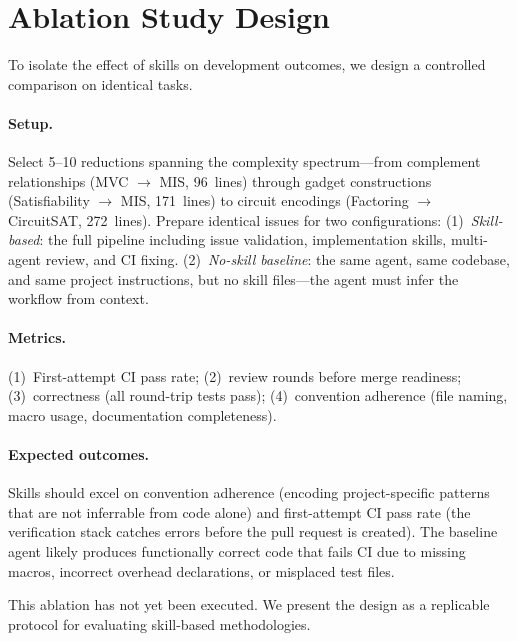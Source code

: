 \documentclass[conference]{IEEEtran}
\begin{document}
\section{Ablation Study Design}\label{app:ablation}

To isolate the effect of skills on development outcomes, we design a controlled comparison on identical tasks.

\paragraph{Setup.}
Select 5--10 reductions spanning the complexity spectrum---from complement relationships (MVC $\to$ MIS, 96~lines) through gadget constructions (Satisfiability $\to$ MIS, 171~lines) to circuit encodings (Factoring $\to$ CircuitSAT, 272~lines).
Prepare identical issues for two configurations:
(1)~\emph{Skill-based}: the full pipeline including issue validation, implementation skills, multi-agent review, and CI fixing.
(2)~\emph{No-skill baseline}: the same agent, same codebase, and same project instructions, but no skill files---the agent must infer the workflow from context.

\paragraph{Metrics.}
(1)~First-attempt CI pass rate; (2)~review rounds before merge readiness; (3)~correctness (all round-trip tests pass); (4)~convention adherence (file naming, macro usage, documentation completeness).

\paragraph{Expected outcomes.}
Skills should excel on convention adherence (encoding project-specific patterns that are not inferrable from code alone) and first-attempt CI pass rate (the verification stack catches errors before the pull request is created).
The baseline agent likely produces functionally correct code that fails CI due to missing macros, incorrect overhead declarations, or misplaced test files.

This ablation has not yet been executed.
We present the design as a replicable protocol for evaluating skill-based methodologies.
\end{document}
